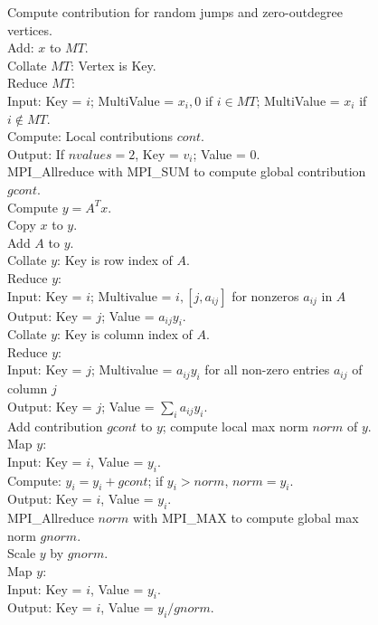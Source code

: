 \begin{figure}[htb]
\begin{center}
{\begin{minipage}{\textwidth}
\begin{tabbing}
\> Compute contribution for random jumps and zero-outdegree vertices. \\
\> \> Add: $x$ to $MT$. \\
\> \> Collate $MT$:  Vertex is Key. \\
\> \> Reduce $MT$:   \\
\> \> \> Input:  Key = $i$; MultiValue = $x_i, 0$ if $i \in {MT}$; MultiValue = $x_i$ if $i \notin {MT}$. \\
\> \> \> Compute:  Local contributions $cont$. \\
\> \> \> Output:  If ${nvalues} = 2$, Key = $v_i$; Value = 0. \\
\> \> MPI\_Allreduce with MPI\_SUM to compute global contribution $gcont$. \\
\> Compute $y = A^T x$.  \\
\> \> Copy $x$ to $y$. \\
\> \> Add $A$ to $y$. \\
\> \> Collate $y$:  Key is row index of $A$. \\
\> \> Reduce $y$: \\
\> \> \>  Input: Key = $i$; Multivalue = $i, [j, a_{ij}]$ for nonzeros $a_{ij}$ in $A$ \\
\> \> \>  Output:  Key = $j$; Value = $a_{ij} y_i$. \\
\> \> Collate $y$:  Key is column index of $A$. \\
\> \> Reduce $y$:  \\
\> \> \> Input:  Key = $j$; Multivalue = $a_{ij} y_i$ for all non-zero entries $a_{ij}$ of column $j$ \\
\> \> \> Output:  Key = $j$; Value = $\sum_i a_{ij} y_i$. \\
\> Add contribution $gcont$ to $y$; compute local max norm $norm$ of $y$. \\
\> \> Map $y$:  \\
\> \> \> Input:  Key = $i$, Value = $y_i$. \\
\> \> \> Compute: $y_i = y_i + gcont$; if $y_i > {norm}$, $norm = y_i$. \\
\> \> \> Output:  Key = $i$, Value = $y_i$. \\
\> \> MPI\_Allreduce $norm$ with MPI\_MAX to compute global max norm $gnorm$. \\
\> Scale $y$ by $gnorm$. \\
\> \> Map $y$: \\
\> \> \> Input:  Key = $i$, Value = $y_i$. \\
\> \> \> Output:  Key = $i$, Value = $y_i / {gnorm}$. \\

\end{tabbing}
\end{minipage}}
\end{center}
\end{figure}

